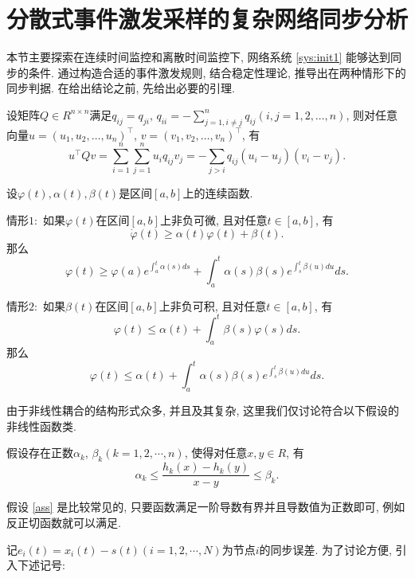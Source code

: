 \section{分散式事件激发采样的复杂网络同步分析}
    本节主要探索在连续时间监控和离散时间监控下, 网络系统 \eqref{sys:init1} 能够达到同步的条件. 通过构造合适的事件激发规则, 结合稳定性理论, 推导出在两种情形下的同步判据. 在给出结论之前, 先给出必要的引理.
    \begin{lem}\label{lem:5}
            设矩阵$Q\in R^{n \times n}$满足$q_{ij}=q_{ji}$, $q_{ii} =-\sum_{j=1,i \neq j}^n q_{ij}(i,j=1,2,\ldots,n)$, 则对任意向量$u=(u_1,u_2,\ldots,u_n)^\top$, $v=(v_1,v_2,\ldots,v_n)^\top$, 有
            $$u^\top Qv=\sum_{i=1}^n\sum_{j=1}^n u_i q_{ij} v_j=-\sum_{j>i}q_{ij}(u_i-u_j)(v_i-v_j).$$
    \end{lem}
    \begin{lem}\label{lem:6}{\rm{}}
        设$\varphi(t), \alpha(t), \beta(t)$是区间$[a,b]$上的连续函数.

       情形$1:$ 如果$\varphi(t)$在区间$[a,b]$上非负可微, 且对任意$t\in [a,b]$, 有
            $$\dot{\varphi}(t)\geq \alpha(t)\varphi(t)+\beta(t).$$
       那么
            $$\varphi(t)\geq\varphi(a)e^{\int^{t}_{a}\alpha(s)ds}+\int^{t}_{a}\alpha(s)\beta(s)e^{\int^{t}_{s}\beta(u)du}ds.$$

       情形$2:$ 如果$\beta(t)$在区间$[a,b]$上非负可积, 且对任意$t\in [a,b]$, 有
            $$\varphi(t)\leq \alpha(t)+\int^{t}_{a}\beta(s)\varphi(s)ds.$$
         那么
            $$\varphi(t)\leq \alpha(t)+\int^{t}_{a}\alpha(s)\beta(s)e^{\int^{t}_{s}\beta(u)du}ds.$$
    \end{lem}
    由于非线性耦合的结构形式众多, 并且及其复杂, 这里我们仅讨论符合以下假设的非线性函数类.
    \begin{hyp}\label{ass}
        假设存在正数$\alpha_{k}$, $\beta_{k}(k=1,2,\cdots,n)$, 使得对任意$x,y\in R$, 有
                $$\alpha_{k}\leq\frac{h_{k}(x)-h_{k}(y)}{x-y}\leq\beta_{k}.$$
    \end{hyp}
    \begin{rem}
        假设 \ref{ass} 是比较常见的, 只要函数满足一阶导数有界并且导数值为正数即可, 例如反正切函数就可以满足.
    \end{rem}
    记$e_{i}(t)=x_{i}(t)-s(t)(i=1,2,\cdots,N)$为节点$i$的同步误差. 为了讨论方便, 引入下述记号:
